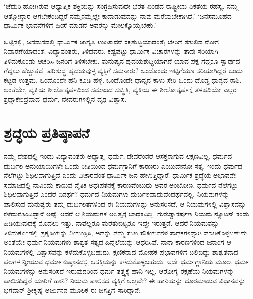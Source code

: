 ‘ಚೆದುರಿ ಹೋಗಿರುವ ಆಧ್ಯಾತ್ಮಿಕ ಶಕ್ತಿಯನ್ನು ಸಂಗ್ರಹಿಸುವುದೇ ಭರತ ಖಂಡದ ರಾಷ್ಟ್ರೀಯ ಏಕತೆಯ ರಹಸ್ಯ. ನಮ್ಮ ಆತ್ಮೋದ್ಧಾರ ಆಗಬೇಕೆಂದಿದ್ದರೆ ನಮ್ಮನಮ್ಮಲ್ಲೇ ಕಾದಾಡುವುದನ್ನು ನಾವು ಮರೆಯಬೇಕಾಗಿದೆ.’ ‘ಜನಸಮೂಹದ ಧಾರ್ಮಿಕ ಭಾವನೆಗಳಿಗೆ ಹಿಂಸೆ ಮಾಡದೆ ಅವರನ್ನು ಮೇಲಕ್ಕೊಯ್ಯಬೇಕು.’

\newpage

ಒಟ್ಟಿನಲ್ಲಿ, ಜನಮನದಲ್ಲಿ ಧಾರ್ಮಿಕ ಜಾಗೃತಿ ಉಂಟಾದರೆ ರಕ್ತಶುದ್ಧಿಯಾದಂತೆ; ಬೇರಿಗೆ ತಗುಲಿದ ರೋಗ ನಿವಾರಣೆಯಾದಂತೆ. ವಿದ್ಯಾವಂತರು, ತಿಳಿದವರು, ಕಷ್ಟಪಟ್ಟು ಧಾರ್ಮಿಕ ವಿಚಾರಗಳನ್ನು ತಾವು ಸರಿಯಾಗಿ ತಿಳಿದುಕೊಂಡು ಆಚರಿಸಿ ಜನರಿಗೆ ತಿಳಿಸಬೇಕು. ಮನುಷ್ಯನ ಹೃದಯಶುದ್ಧಿಯಾಗದೆ ಯಾವ ಪಕ್ಷ ಗೆದ್ದರೂ ಸ್ವಾರ್ಥದ ಗೆದ್ದಲು ಹೆಚ್ಚುತ್ತದೆ. ಪರಿಶುದ್ಧ ಹೃದಯವುಳ್ಳ ವ್ಯಕ್ತಿಗೆ ಸಮನಾರು? ಒಂದೊಂದು ಇಟ್ಟಿಗೆಯೂ ಸರಿಯಾಗಿದ್ದರೆ ಒಂದು ಕಟ್ಟಡ ಉತ್ತಮ. ಒಂದೊಂದೇ ಹನಿ ಕೂಡಿ ಹಳ್ಳ. ಒಂದೊಂದೇ ಧಾನ್ಯದ ಕಾಳು ಸೇರಿ ಒಂದು ದೊಡ್ಡ ಧಾನ್ಯದ ರಾಶಿ. ಅಂತೆಯೇ, ವ್ಯಕ್ತಿಯ ಶೀಲೋತ್ಕರ್ಷದಿಂದ ಸಮಾಜದ ಸುಸ್ಥಿತಿ, ವ್ಯಕ್ತಿಯ ಈ ಶೀಲೋತ್ಕರ್ಷಕ್ಕೆ ತಳಹದಿಯೇ ಎಲ್ಲರ ಶ್ರದ್ಧಾಕೇಂದ್ರವಾದ–ಧರ್ಮ, ದೇವರುಗಳಲ್ಲಿನ ದೃಢ ವಿಶ್ವಾಸ.


\section*{ಶ್ರದ್ಧೆಯ ಪ್ರತಿಷ್ಠಾಪನೆ}


ನಮ್ಮ ದೇಶದಲ್ಲಿ ಇಂದು ವಿದ್ಯಾವಂತರು ಅಧ್ಯಾತ್ಮ, ಧರ್ಮ, ದೇವರೆಂದರೆ ಆಸಕ್ತರಾಗುವ ಲಕ್ಷಣವಿಲ್ಲ. ಧರ್ಮದ ದುರ್ಬಲ ಅನುಯಾಯಿಗಳೇ ಒಂದು ರೀತಿಯಿಂದ ಧರ್ಮಗ್ಲಾನಿಗೆ ಕಾರಣರು ಎಂಬುದೇನೋ ಸತ್ಯ. ಇಂದು ಧರ್ಮದ ನೆಲೆಗಟ್ಟು ಶಿಥಿಲವಾಗುತ್ತಿದೆ ಎಂದು ವಿಚಾರವಂತ ಧಾರ್ಮಿಕ ಜನ ಹೇಳುತ್ತಿದ್ದಾರೆ. ಧಾರ್ಮಿಕ ಶ್ರದ್ಧೆಯ ಅಭಾವವೇ ಸಮಾಜದಲ್ಲಿ ನಾವಿಂದು ಕಾಣುವ ನೈತಿಕ ಅಧಃಪತನಕ್ಕೆ ಕಾರಣವೆಂಬುದು ಅವರ ಅಂಬೋಣ. ಧರ್ಮದ ನೆಲೆಗಟ್ಟು ಶಿಥಿಲವಾಗುತ್ತಿದೆ ಎಂದರೆ ಏನರ್ಥ? ಧರ್ಮದ ನಿಯಮಗಳು ದುರ್ಬಲವಾದುವೆಂದರ್ಥವಲ್ಲ. ನಿಯಮಗಳನ್ನು ಪಾಲಿಸುವ ಮನುಷ್ಯರು ತಮ್ಮ ದುರ್ಬಲತೆಗಳಿಂದ ಈ ನಿಯಮಗಳನ್ನು ಅನುಸರಿಸದೆ, ಆ ನಿಯಮಗಳಲ್ಲಿ ವಿಶ್ವಾಸವನ್ನು ಕಳೆದುಕೊಂಡಿದ್ದಾರೆ ಅಷ್ಟೆ. ಆದರೆ ಆ ನಿಯಮಗಳ ಅಸ್ತಿತ್ವಕ್ಕೆ ಬಾಧಕವಿಲ್ಲ. ಗುರುತ್ವಾಕರ್ಷಣ ನಿಯಮ ನ್ಯೂಟನ್ ಕಂಡು ಹಿಡಿಯುವುದಕ್ಕೆ ಮೊದಲು ಇತ್ತು. ನಾವೆಲ್ಲರೂ ಮರೆತುಬಿಟ್ಟರೂ ಇದ್ದೇ ಇರುತ್ತದೆ. ಆದರೆ ನಿಯಮವನ್ನು ತಿಳಿದುಕೊಂಡಲ್ಲಿ ಪ್ರಕೃತಿಯನ್ನು ನಿಯಂತ್ರಿಸಿ, ಅದನ್ನು ನಮ್ಮ ಸುಖ ಸೌಕರ್ಯಗಳ ಸಾಧಕಗಳನ್ನಾಗಿ ಮಾಡಿಕೊಳ್ಳಬಹುದು. ಅಂತೆಯೇ ಧರ್ಮ ನಿಯಮಗಳು ಶಾಶ್ವತ ಸತ್ಯದ ಹಿನ್ನೆಲೆಯನ್ನು ಆಧರಿಸಿವೆ. ನಾನಾ ಕಾರಣಗಳಿಂದ ಜನಾಂಗ ಆ ನಿಯಮಗಳಲ್ಲಿ ವಿಶ್ವಾಸವನ್ನು ಕಳೆದುಕೊಳ್ಳಬಹುದು. ಕ್ಷಣಿಕವಾದ ಮೋಹಕ ಪ್ರಭಾವಗಳಿಗೆ ಬಲಿಬಿದ್ದು ಶಾಶ್ವತವಾದ ಫಲಗಳ ನ್ನೀಯುವ ಧರ್ಮಾನುಷ್ಠಾನದಲ್ಲಿ ಆಸಕ್ತಿಯನ್ನು ಕಳೆದುಕೊಳ್ಳಬಹುದು. ಅದೇ ಧರ್ಮಗ್ಲಾನಿಯ ಮೂಲ. ಧರ್ಮ ನಿಯಮಗಳನ್ನು ಅನುಸರಿಸದೆ ಇರುವುದರಿಂದ ಧರ್ಮ ತತ್ತ್ವಕ್ಕೆ ಹಾನಿ ಇಲ್ಲ. ಆರೋಗ್ಯ ರಕ್ಷಣೆಯ ನಿಯಮಗಳನ್ನು ಪಾಲಿಸದಿದ್ದರೆ ಯಾರಿಗೆ ಹಾನಿ? ನಿಯಮ ಪಾಲಿಸದ ವ್ಯಕ್ತಿಗೆ ಅಲ್ಲವೇ? ಈ ಹಾನಿಯನ್ನು ದೂರಮಾಡುವ ವಿಧಾನವನ್ನು ಭಗವಾನ್ ಶ‍್ರೀಕೃಷ್ಣ ಅರ್ಜುನನ ಮೂಲಕ ಈ ಜಗತ್ತಿಗೆ ಸಾರಿದ್ದಾನೆ:

